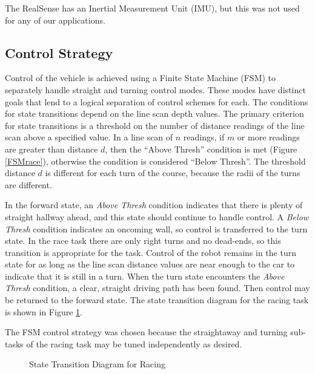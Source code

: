 \documentclass[letterpaper, 10 pt, conference]{ieeeconf}  %
\begin{document}
The RealSense has an Inertial Measurement Unit (IMU), but this was not used for any of our applications.

\subsection{Control Strategy}

Control of the vehicle is achieved using a Finite State Machine (FSM) to separately handle straight and turning control modes.  These modes have distinct goals that lend to a logical separation of control schemes for each.  The conditions for state transitions depend on the line scan depth values.  The primary criterion for state transitions is a threshold on the number of distance readings of the line scan above a specified value.  In a line scan of $n$ readings, if $m$ or more readings are greater than distance $d$, then the ``Above Thresh'' condition is met (Figure \ref{FSMrace}), otherwise the condition is considered ``Below Thresh''.  The threshold distance $d$ is different for each turn of the course, because the radii of the turns are different.  

In the forward state, an \textit{Above Thresh} condition indicates that there is plenty of straight hallway ahead, and this state should continue to handle control. A \textit{Below Thresh} condition indicates an oncoming wall, so control is transferred to the turn state.  In the race task there are only right turns and no dead-ends, so this transition is appropriate for the task.  Control of the robot remains in the turn state for as long as the line scan distance values are near enough to the car to indicate that it is still in a turn.  When the turn state encounters the \textit{Above Thresh} condition, a clear, straight driving path has been found. Then control may be returned to the forward state.  The state transition diagram for the racing task is shown in Figure \ref{FSMmain}. 

The FSM control strategy was chosen because the straightaway and turning sub-tasks of the racing task may be tuned independently as desired.  

\tikzset{
    ->,
    >=latex,
}

\begin{figure}[h!]
    \centering
    \caption{State Transition Diagram for Racing}
    \label{FSMmain}
\end{figure}
\end{document}
